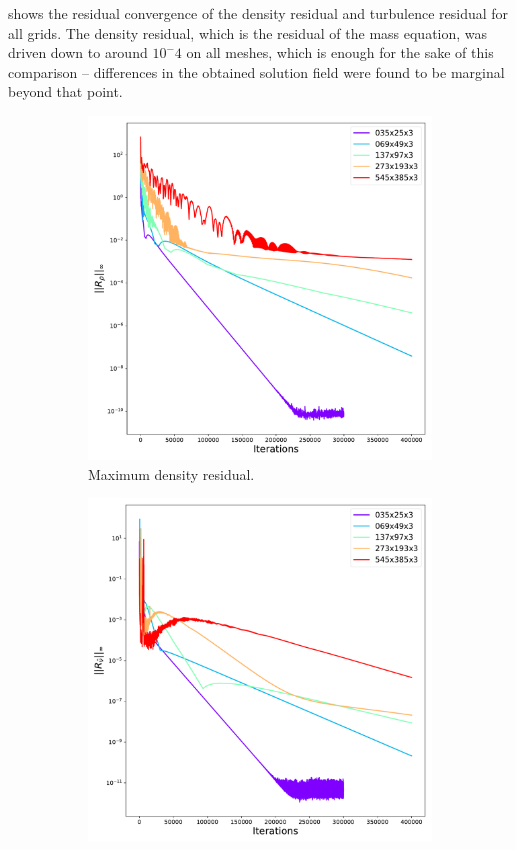  shows the residual convergence of the density residual and turbulence residual for all grids. The density residual, which is the residual of the mass equation, was driven down to around $10^-4$ on all meshes, which is enough for the sake of this comparison -- differences in the obtained solution field were found to be marginal beyond that point.
\begin{figure}[ht!]
\centering
\begin{subfigure}{.45\textwidth}
  \centering
  \includegraphics[width=1.0\textwidth]{figs/flat/gov_convergence_gridstudy.pdf}
  \caption{Maximum density residual.}
\end{subfigure}%
\begin{subfigure}{.45\textwidth}
    \centering
    \includegraphics[width=1.0\textwidth]{figs/flat/SA_convergence_gridstudy.pdf}

\end{subfigure}
\end{figure}
